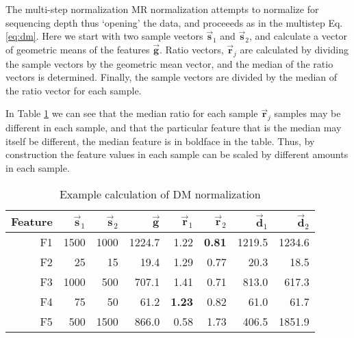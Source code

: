 The multi-step normalization MR normalization attempts to normalize for sequencing depth thus `opening' the data, and proceeeds as in the multistep Eq. \ref{eq:dm}. Here we start with two sample vectors $\vec{\textbf{s}}_1$ and $\vec{\textbf{s}}_2$, and calculate a vector of geometric means of the features $\vec{\textbf{g}}$. Ratio vectors, $\vec{\textbf{r}}_j$ are calculated by dividing the sample vectors by the geometric mean vector, and the median of the ratio vectors is determined. Finally, the sample vectors are divided by the median of the ratio vector for each sample. 



In Table \ref{tab:des} we can see that the median ratio for each sample $\vec{\textbf{r}}_j$  samples may be different in each sample, and that the particular feature that is the median may itself be different, the median feature is in boldface in the table. Thus, by construction the feature values in each sample can be scaled by different amounts in each sample. 


\begin{table}[!h]
\caption{Example calculation of DM normalization}
\centering
\begin{tabular}{r r r r r r r r}
\hline
Feature & $\vec{\textbf{s}}_1$ & $\vec{\textbf{s}}_2$ & $\vec{\textbf{g}}$ & $\vec{\textbf{r}}_1$ & $\vec{\textbf{r}}_2$ & $\vec{\textbf{d}}_1$ & $\vec{\textbf{d}}_2$ \\ \hline \hline
F1 & 1500 & 1000 & 1224.7 & 1.22 & {\bf 0.81} & 1219.5 & 1234.6\\
F2 & 25 & 15 & 19.4 & 1.29 & 0.77 & 20.3 & 18.5 \\
F3 & 1000 & 500 & 707.1 & 1.41 & 0.71 & 813.0 & 617.3 \\
F4 & 75 & 50 & 61.2 & {\bf 1.23} &  0.82 & 61.0 & 61.7 \\
F5 & 500 & 1500 & 866.0 & 0.58 & 1.73 & 406.5 & 1851.9\\ \hline
\end{tabular}
\label{tab:des}
\end{table}

